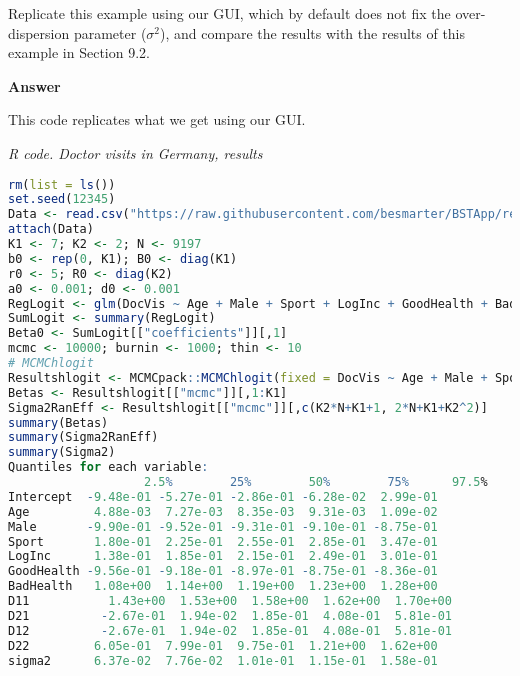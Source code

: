 \begin{enumerate}[leftmargin=*]
Replicate this example using our GUI, which by default does not fix the over-dispersion parameter ($\sigma^2$), and compare the results with the results of this example in Section 9.2.

\textbf{Answer}

This code replicates what we get using our GUI.

\begin{tcolorbox}[enhanced,width=4.67in,center upper,
	fontupper=\large\bfseries,drop shadow southwest,sharp corners]
	\textit{R code. Doctor visits in Germany, results}
	\begin{VF}
		\begin{lstlisting}[language=R]
rm(list = ls())
set.seed(12345)
Data <- read.csv("https://raw.githubusercontent.com/besmarter/BSTApp/refs/heads/master/DataApp/9VisitDoc.csv", sep = ",", header = TRUE, quote = "")
attach(Data)
K1 <- 7; K2 <- 2; N <- 9197
b0 <- rep(0, K1); B0 <- diag(K1)
r0 <- 5; R0 <- diag(K2)
a0 <- 0.001; d0 <- 0.001
RegLogit <- glm(DocVis ~ Age + Male + Sport + LogInc + GoodHealth + BadHealth, family = binomial(link = "logit"))
SumLogit <- summary(RegLogit)
Beta0 <- SumLogit[["coefficients"]][,1]
mcmc <- 10000; burnin <- 1000; thin <- 10
# MCMChlogit
Resultshlogit <- MCMCpack::MCMChlogit(fixed = DocVis ~ Age + Male + Sport + LogInc + GoodHealth + BadHealth, random = ~Sozh, group="id", data = Data, burnin = burnin, mcmc = mcmc, thin = thin, mubeta = b0, Vbeta = B0, r = r0, R = R0, nu = a0, delta = d0, beta.start = Beta0, FixOD = 0)
Betas <- Resultshlogit[["mcmc"]][,1:K1]
Sigma2RanEff <- Resultshlogit[["mcmc"]][,c(K2*N+K1+1, 2*N+K1+K2^2)]
summary(Betas)
summary(Sigma2RanEff)
summary(Sigma2)
Quantiles for each variable:
				   2.5%        25%        50%        75%      97.5%
Intercept  -9.48e-01 -5.27e-01 -2.86e-01 -6.28e-02  2.99e-01
Age         4.88e-03  7.27e-03  8.35e-03  9.31e-03  1.09e-02
Male       -9.90e-01 -9.52e-01 -9.31e-01 -9.10e-01 -8.75e-01
Sport       1.80e-01  2.25e-01  2.55e-01  2.85e-01  3.47e-01
LogInc      1.38e-01  1.85e-01  2.15e-01  2.49e-01  3.01e-01
GoodHealth -9.56e-01 -9.18e-01 -8.97e-01 -8.75e-01 -8.36e-01
BadHealth   1.08e+00  1.14e+00  1.19e+00  1.23e+00  1.28e+00
D11		      1.43e+00  1.53e+00  1.58e+00  1.62e+00  1.70e+00
D21		     -2.67e-01  1.94e-02  1.85e-01  4.08e-01  5.81e-01
D12		     -2.67e-01  1.94e-02  1.85e-01  4.08e-01  5.81e-01
D22         6.05e-01  7.99e-01  9.75e-01  1.21e+00  1.62e+00
sigma2      6.37e-02  7.76e-02  1.01e-01  1.15e-01  1.58e-01
\end{lstlisting}
	\end{VF}
\end{tcolorbox}


\end{enumerate}
